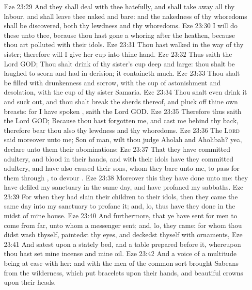 \vs Eze 23:29 And they shall deal with thee hatefully, and shall take away all thy labour, and shall leave thee naked and bare: and the nakedness of thy whoredoms shall be discovered, both thy lewdness and thy whoredoms.
\vs Eze 23:30 I will do these  unto thee, because thou hast gone a whoring after the heathen,  because thou art polluted with their idols.
\vs Eze 23:31 Thou hast walked in the way of thy sister; therefore will I give her cup into thine hand.
\vs Eze 23:32 Thus saith the Lord GOD; Thou shalt drink of thy sister's cup deep and large: thou shalt be laughed to scorn and had in derision; it containeth much.
\vs Eze 23:33 Thou shalt be filled with drunkenness and sorrow, with the cup of astonishment and desolation, with the cup of thy sister Samaria.
\vs Eze 23:34 Thou shalt even drink it and suck  out, and thou shalt break the sherds thereof, and pluck off thine own breasts: for I have spoken , saith the Lord GOD.
\vs Eze 23:35 Therefore thus saith the Lord GOD; Because thou hast forgotten me, and cast me behind thy back, therefore bear thou also thy lewdness and thy whoredoms.
\vs Eze 23:36 The \textsc{Lord} said moreover unto me; Son of man, wilt thou judge Aholah and Aholibah? yea, declare unto them their abominations;
\vs Eze 23:37 That they have committed adultery, and blood  in their hands, and with their idols have they committed adultery, and have also caused their sons, whom they bare unto me, to pass for them through , to devour .
\vs Eze 23:38 Moreover this they have done unto me: they have defiled my sanctuary in the same day, and have profaned my sabbaths.
\vs Eze 23:39 For when they had slain their children to their idols, then they came the same day into my sanctuary to profane it; and, lo, thus have they done in the midst of mine house.
\vs Eze 23:40 And furthermore, that ye have sent for men to come from far, unto whom a messenger  sent; and, lo, they came: for whom thou didst wash thyself, paintedst thy eyes, and deckedst thyself with ornaments,
\vs Eze 23:41 And satest upon a stately bed, and a table prepared before it, whereupon thou hast set mine incense and mine oil.
\vs Eze 23:42 And a voice of a multitude being at ease  with her: and with the men of the common sort  brought Sabeans from the wilderness, which put bracelets upon their hands, and beautiful crowns upon their heads.
